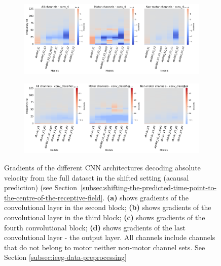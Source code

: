 \begin{figure}[!htbp]\ContinuedFloat
\begin{subfigure}[b]{\textwidth}
   \includegraphics[width=1\linewidth]{img/appendix/A/conv-4/sm/absVel-model-gradients_all_kinds}
   \caption{}
   \label{fig:absVel-shifted-grads-conv-4}
\end{subfigure}

\begin{subfigure}[b]{\textwidth}
   \includegraphics[width=1\linewidth]{img/appendix/A/conv-classifier/sm/absVel-model-gradients_all_kinds}
   \caption{}
   \label{fig:absVel-shifted-grads-conv-classifier}
\end{subfigure}

\caption[]{Gradients of the different CNN architectures decoding absolute velocity from the full dataset in the shifted setting (acausal prediction) (see Section~\ref{subsec:shifting-the-predicted-time-point-to-the-centre-of-the-receptive-field}. \textbf{(a)} shows gradients of the convolutional layer in the second block; \textbf{(b)} shows gradients of the convolutional layer in the third block; \textbf{(c)} shows gradients of the fourth convolutional block; \textbf{(d)} shows gradients of the last convolutional layer - the output layer. All channels include channels that do not belong to motor neither non-motor channel sets. See Section \ref{subsec:ieeg-data-preprocessing}}
\label{fig:absVel-shifted-grads}
\end{figure}

